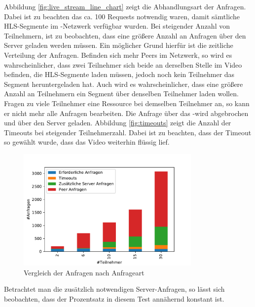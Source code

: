 Abbildung \ref{fig:live_stream_line_chart} zeigt die Abhandlungsart der Anfragen. Dabei ist zu beachten das ca. 100 Requests notwendig waren, damit sämtliche HLS-Segmente im \pTp-Netzwerk verfügbar wurden. Bei steigender Anzahl von Teilnehmern, ist zu beobachten, dass eine größere Anzahl an Anfragen über den Server geladen werden müssen. Ein möglicher Grund hierfür ist die zeitliche Verteilung der Anfragen. Befinden sich mehr Peers im Netzwerk, so wird es wahrscheinlicher, dass zwei Teilnehmer sich beide an derselben Stelle im Video befinden, die HLS-Segmente laden müssen, jedoch noch kein Teilnehmer das Segment heruntergeladen hat. Auch wird es wahrscheinlicher, dass eine größere Anzahl an Teilnehmern ein Segment über denselben Teilnehmer laden wollen. Fragen zu viele Teilnehmer eine Ressource bei demselben Teilnehmer an, so kann er nicht mehr alle Anfragen bearbeiten. Die Anfrage über das \pTp-\cdn wird abgebrochen und über den Server geladen. Abbildung \ref{fig:timeouts} zeigt die Anzahl der Timeouts bei steigender Teilnehmerzahl. Dabei ist zu beachten, dass der Timeout so gewählt wurde, dass das Video weiterhin flüssig lief.


\begin{figure}[!h]
	\centering
	\includegraphics[width=0.8\textwidth]{figures/anfragen_verteilung_bar}
	\caption[A Figure Short-Title]{Vergleich der Anfragen nach Anfrageart}
	\label{fig:anfragen_verteilung_bar}
\end{figure}


Betrachtet man die zusätzlich notwendigen Server-Anfragen, so lässt sich beobachten, dass der Prozentsatz in diesem Test annähernd konstant ist.  


